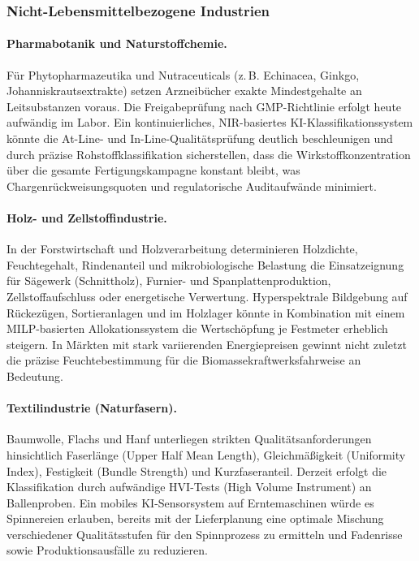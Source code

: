 ﻿\documentclass[12pt,a4paper]{article}
\theoremstyle{plain}
\theoremstyle{definition}
\begin{document}
	\subsubsection{Nicht-Lebensmittelbezogene Industrien}

	\paragraph{Pharmabotanik und Naturstoffchemie.}
	Für Phytopharmazeutika und Nutraceuticals (z.\,B. Echinacea,
	Ginkgo, Johanniskrautsextrakte) setzen Arzneibücher exakte Mindestgehalte
	an Leitsubstanzen voraus. Die Freigabeprüfung nach GMP-Richtlinie erfolgt
	heute aufwändig im Labor. Ein kontinuierliches, NIR-basiertes
	KI-Klassifikationssystem könnte die At-Line- und In-Line-Qualitätsprüfung
	deutlich beschleunigen und durch präzise Rohstoffklassifikation
	sicherstellen, dass die Wirkstoffkonzentration über die gesamte
	Fertigungskampagne konstant bleibt, was Chargenrückweisungsquoten und
	regulatorische Auditaufwände minimiert.

	\paragraph{Holz- und Zellstoffindustrie.}
	In der Forstwirtschaft und Holzverarbeitung determinieren Holzdichte,
	Feuchtegehalt, Rindenanteil und mikrobiologische Belastung die
	Einsatzeignung für Sägewerk (Schnittholz), Furnier- und
	Spanplattenproduktion, Zellstoffaufschluss oder energetische Verwertung.
	Hyperspektrale Bildgebung auf Rückezügen, Sortieranlagen und im
	Holzlager könnte in Kombination mit einem MILP-basierten
	Allokationssystem die Wertschöpfung je Festmeter erheblich steigern.
	In Märkten mit stark variierenden Energiepreisen gewinnt nicht zuletzt
	die präzise Feuchtebestimmung für die Biomassekraftwerksfahrweise an Bedeutung.

	\paragraph{Textilindustrie (Naturfasern).}
	Baumwolle, Flachs und Hanf unterliegen strikten Qualitätsanforderungen
	hinsichtlich Faserlänge (Upper Half Mean Length), Gleichmäßigkeit
	(Uniformity Index), Festigkeit (Bundle Strength) und Kurzfaseranteil.
	Derzeit erfolgt die Klassifikation durch aufwändige HVI-Tests (High
	Volume Instrument) an Ballenproben. Ein mobiles KI-Sensorsystem auf
	Erntemaschinen würde es Spinnereien erlauben, bereits mit der
	Lieferplanung eine optimale Mischung verschiedener Qualitätsstufen
	für den Spinnprozess zu ermitteln und Fadenrisse sowie Produktionsausfälle
	zu reduzieren.
\end{document}
